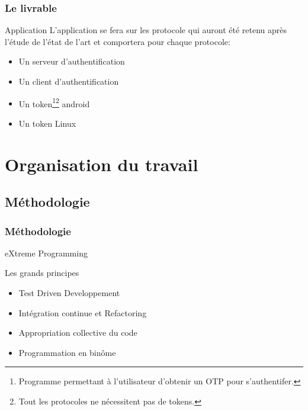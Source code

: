 \documentclass[xcolor=table]{beamer}
\begin{document}
\begin{frame}
\frametitle{Le livrable}
\begin{block}{Application}
    L'application se fera sur les protocole qui auront été retenu après l'étude de 
  l'état de l'art et comportera pour chaque protocole:
  \begin{itemize}
    \item Un serveur d'authentification
    \item Un client d'authentification
    \item Un token\footnote[1]{Programme permettant à l'utilisateur d'obtenir un 
      OTP pour s'authentifer.}\footnote[2]{Tout les protocoles ne 
      nécessitent pas de tokens.} android
    \item Un token Linux
  \end{itemize}
\end{block}

\end{frame}


\section{Organisation du travail}

\subsection{Méthodologie}
\begin{frame}
\frametitle{Méthodologie}
\begin{center}
\Huge eXtreme Programming
\normalsize
\begin{block}{Les grands principes}
\begin{itemize}
 \item Test Driven Developpement
 \item Intégration continue et Refactoring
 \item Appropriation collective du code
 \item Programmation en binôme
\end{itemize}
\end{block}
\end{center}

\end{frame}
\end{document}
